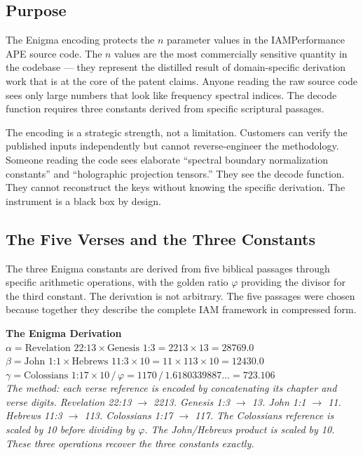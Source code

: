 \documentclass[12pt,a4paper]{article}
\begin{document}
\subsection{Purpose}

The Enigma encoding protects the $n$ parameter values in the IAMPerformance
APE source code. The $n$ values are the most commercially sensitive quantity
in the codebase --- they represent the distilled result of domain-specific
derivation work that is at the core of the patent claims. Anyone reading the
raw source code sees only large numbers that look like frequency spectral
indices. The decode function requires three constants derived from specific
scriptural passages.

The encoding is a strategic strength, not a limitation. Customers can verify
the published inputs independently but cannot reverse-engineer the methodology.
Someone reading the code sees elaborate ``spectral boundary normalization
constants'' and ``holographic projection tensors.'' They see the decode
function. They cannot reconstruct the keys without knowing the specific
derivation. The instrument is a black box by design.

\subsection{The Five Verses and the Three Constants}

The three Enigma constants are derived from five biblical passages through
specific arithmetic operations, with the golden ratio $\varphi$ providing
the divisor for the third constant. The derivation is not arbitrary. The
five passages were chosen because together they describe the complete IAM
framework in compressed form.

\begin{keybox}
\textbf{The Enigma Derivation}\\[0.8em]
$\displaystyle\alpha = \text{Revelation 22:13} \times \text{Genesis 1:3}
  = 2213 \times 13 = 28769.0$\\[0.5em]
$\displaystyle\beta = \text{John 1:1} \times \text{Hebrews 11:3} \times 10
  = 11 \times 113 \times 10 = 12430.0$\\[0.5em]
$\displaystyle\gamma = \text{Colossians 1:17} \times 10 \,/\, \varphi
  = 1170 \,/\, 1.6180339887\ldots = 723.106$\\[0.8em]
\textit{The method: each verse reference is encoded by concatenating its
chapter and verse digits. Revelation 22:13 $\to$ 2213. Genesis 1:3 $\to$ 13.
John 1:1 $\to$ 11. Hebrews 11:3 $\to$ 113. Colossians 1:17 $\to$ 117.
The Colossians reference is scaled by 10 before dividing by $\varphi$.
The John/Hebrews product is scaled by 10. These three operations recover
the three constants exactly.}
\end{keybox}
\end{document}
